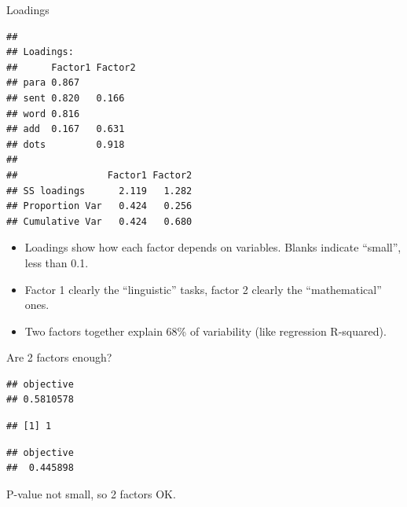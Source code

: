 \begin{frame}[fragile]{Loadings}

  \begin{minipage}[t]{0.58\linewidth}
    {\small
\begin{knitrout}
\color{fgcolor}\begin{kframe}
\begin{alltt}
\hlopt{$}
\end{alltt}
\begin{verbatim}
## 
## Loadings:
##      Factor1 Factor2
## para 0.867          
## sent 0.820   0.166  
## word 0.816          
## add  0.167   0.631  
## dots         0.918  
## 
##                Factor1 Factor2
## SS loadings      2.119   1.282
## Proportion Var   0.424   0.256
## Cumulative Var   0.424   0.680
\end{verbatim}
\end{kframe}
\end{knitrout}
}

  \end{minipage}
  \begin{minipage}[t]{0.40\linewidth}
  \begin{itemize}
  \item Loadings show how each factor depends on variables. Blanks
    indicate ``small'', less than 0.1.
  \item Factor 1 clearly the ``linguistic'' tasks, factor 2 clearly
    the ``mathematical'' ones.
  \item Two factors together explain 68\% of variability (like
    regression R-squared).
  \end{itemize}    
  \end{minipage}
\end{frame}


\begin{frame}[fragile]{Are 2 factors enough?}
  
\begin{knitrout}
\color{fgcolor}\begin{kframe}
\begin{alltt}
\hlopt{$}
\end{alltt}
\begin{verbatim}
## objective 
## 0.5810578
\end{verbatim}
\begin{alltt}
\hlopt{$}
\end{alltt}
\begin{verbatim}
## [1] 1
\end{verbatim}
\begin{alltt}
\hlopt{$}
\end{alltt}
\begin{verbatim}
## objective 
##  0.445898
\end{verbatim}
\end{kframe}
\end{knitrout}

P-value not small, so 2 factors OK.
  
\end{frame}


